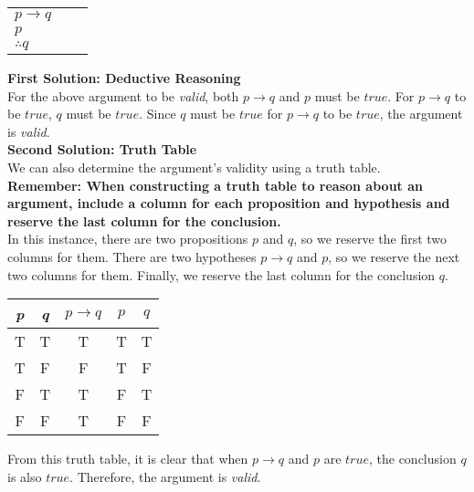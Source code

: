 \begin{table}[h]
\centering
\begin{tabular}{l@{\,}l@{\,}l@{\,}}
  $p \rightarrow q$ & & \\
  $p$ & & \\
\hline
 $\therefore q$ & &
\end{tabular}
\end{table}

\textbf{First Solution: Deductive Reasoning}\\

For the above argument to be \textit{valid}, both $p \rightarrow q$ and $p$ must be $true$.  For $p \rightarrow q$ to be $true$, $q$ must be $true$.  Since $q$ must be $true$ for $p \rightarrow q$ to be $true$, the argument is \textit{valid}.\\

\textbf{Second Solution: Truth Table}\\

We can also determine the argument's validity using a truth table.\\

\textbf{Remember: When constructing a truth table to reason about an argument, include a column for each proposition and hypothesis and reserve the last column for the conclusion.}\\

In this instance, there are two propositions $p$ and $q$, so we reserve the first two columns for them.  There are two hypotheses $p \rightarrow q$ and $p$, so we reserve the next two columns for them.  Finally, we reserve the last column for the conclusion $q$.\\

\begin{table}[h]
\centering
\begin{tabular}{cc|cc|c}
\hline
\textit{p} & \textit{q} & $p \rightarrow q$ & $p$ & $q$ \\ \hline
T & T & T & T & T \\ 
T & F & F & T & F \\ 
F & T & T & F & T \\
F & F & T & F & F \\ \hline
\end{tabular}
\end{table}

From this truth table, it is clear that when $p \rightarrow q$ and $p$ are $true$, the conclusion $q$ is also $true$.  Therefore, the argument is \textit{valid}.

